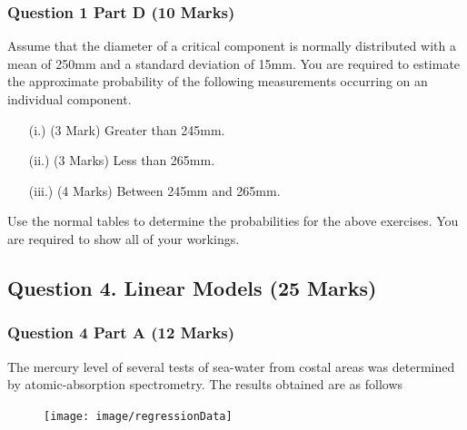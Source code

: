 \documentclass[a4paper,12pt]{article}
\begin{document}
	
	
	
	\bigskip
	\subsubsection*{Question 1 Part D (10 Marks)}
	Assume that the diameter of a critical component is normally distributed with a mean of 250mm and a standard deviation of 15mm. You are required  to estimate the approximate probability of the following measurements occurring on an individual component.
	\begin{itemize}
		\item[(i.)](3 Mark) Greater than 245mm.
		\item[(ii.)](3 Marks) Less than 265mm.
		\item [(iii.)](4 Marks) Between 245mm and 265mm.
	\end{itemize}
	\bigskip
	\noindent Use the normal tables to determine the probabilities for the above exercises. You are required to show all of your workings.
	
	
	\newpage
\subsection*{Question 4. Linear Models (25 Marks)}
\subsubsection*{Question 4 Part A (12 Marks)}
The mercury level of several tests of sea-water from costal areas was determined by atomic-absorption spectrometry. The results obtained are as follows

\begin{figure}[h!]
	\centering
	\texttt{[image: image/regressionData]}
\end{figure}
\end{document}
